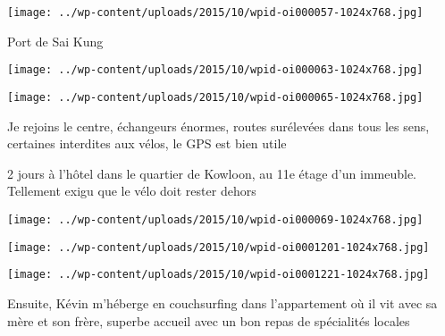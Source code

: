  

 

\begin{center} \texttt{[image: ../wp-content/uploads/2015/10/wpid-oi000057-1024x768.jpg]} \end{center}

 

 Port de Sai Kung 

 

\begin{center} \texttt{[image: ../wp-content/uploads/2015/10/wpid-oi000063-1024x768.jpg]} \end{center}

 

 

\begin{center} \texttt{[image: ../wp-content/uploads/2015/10/wpid-oi000065-1024x768.jpg]} \end{center}

 

 Je rejoins le centre, échangeurs énormes, routes surélevées dans tous les sens, certaines interdites aux vélos, le GPS est bien utile

 2 jours à l'hôtel dans le quartier de Kowloon, au 11e étage d'un immeuble. Tellement exigu que le vélo doit rester dehors 

 

\begin{center} \texttt{[image: ../wp-content/uploads/2015/10/wpid-oi000069-1024x768.jpg]} \end{center}

 

 

\begin{center} \texttt{[image: ../wp-content/uploads/2015/10/wpid-oi0001201-1024x768.jpg]} \end{center}

 

 

\begin{center} \texttt{[image: ../wp-content/uploads/2015/10/wpid-oi0001221-1024x768.jpg]} \end{center}

 

 Ensuite, Kévin m'héberge en couchsurfing dans l'appartement où il vit avec sa mère et son frère, superbe accueil avec un bon repas de spécialités locales 

 

